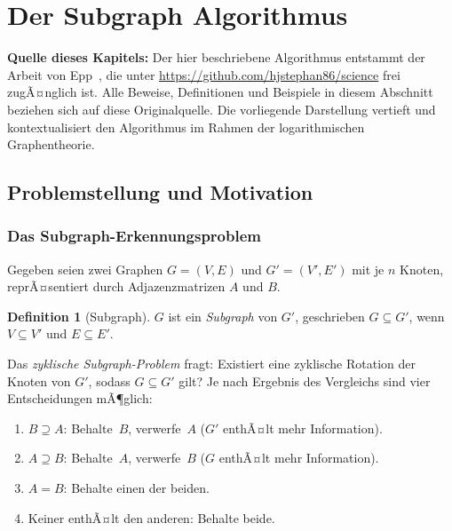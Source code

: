 ﻿\documentclass[12pt,a4paper,twoside]{article}
\theoremstyle{definition}
\newtheorem{definition}{Definition}[section]
\theoremstyle{plain}
\theoremstyle{remark}
\begin{document}
\section{Der Subgraph Algorithmus}
\label{sec:subgraph_algo}

\textbf{Quelle dieses Kapitels:}
Der hier beschriebene Algorithmus entstammt der Arbeit von
Epp~\cite{Epp2026}, die unter
\url{https://github.com/hjstephan86/science} frei zugÃ¤nglich ist.
Alle Beweise, Definitionen und Beispiele in diesem Abschnitt
beziehen sich auf diese Originalquelle.  Die vorliegende Darstellung
vertieft und kontextualisiert den Algorithmus im Rahmen der
logarithmischen Graphentheorie.

\subsection{Problemstellung und Motivation}
\label{sub:sa_motivation}

\subsubsection{Das Subgraph-Erkennungsproblem}

Gegeben seien zwei Graphen $G = (V, E)$ und
$G' = (V', E')$ mit je $n$ Knoten, reprÃ¤sentiert durch
Adjazenzmatrizen $A$ und $B$.

\begin{definition}[Subgraph]
$G$ ist ein \emph{Subgraph} von $G'$, geschrieben
$G \subseteq G'$, wenn $V \subseteq V'$ und $E \subseteq E'$.
\end{definition}

\noindent
Das \emph{zyklische Subgraph-Problem} fragt:
Existiert eine zyklische Rotation der Knoten von $G'$,
sodass $G \subseteq G'$ gilt?  Je nach Ergebnis des
Vergleichs sind vier Entscheidungen mÃ¶glich:
\begin{enumerate}
  \item $B \supseteq A$: Behalte~$B$, verwerfe~$A$
        ($G'$ enthÃ¤lt mehr Information).
  \item $A \supseteq B$: Behalte~$A$, verwerfe~$B$
        ($G$ enthÃ¤lt mehr Information).
  \item $A = B$: Behalte einen der beiden.
  \item Keiner enthÃ¤lt den anderen: Behalte beide.
\end{enumerate}
\end{document}
